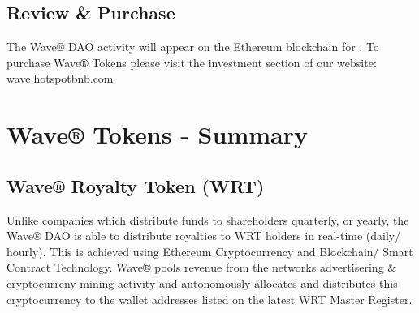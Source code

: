 \documentclass[letterpaper,10pt,openany,oneside,english]{sphinxmanual}
\begin{document}
\section{Review \& Purchase}
\label{\detokenize{introduction:review-purchase}}
The Wave® DAO activity will appear on the Ethereum blockchain for .
To purchase Wave® Tokens please visit the investment section of our website: wave.hotspotbnb.com


\chapter{Wave® Tokens - Summary}
\label{\detokenize{investors:wave-tokens-summary}}\label{\detokenize{investors::doc}}

\section{Wave® Royalty Token (WRT)}
\label{\detokenize{investors:wave-royalty-token-wrt}}
Unlike companies which distribute funds to shareholders quarterly, or yearly, the Wave® DAO is able to distribute royalties to WRT holders in real-time (daily/ hourly).
This is achieved using Ethereum Cryptocurrency and Blockchain/ Smart Contract Technology.
Wave® pools revenue from the networks advertisering \& cryptocurreny mining activity and autonomously allocates and distributes this cryptocurrency to the wallet addresses listed on the latest WRT Master Register.
\end{document}
